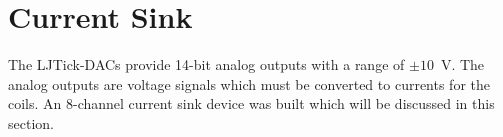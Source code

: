 





\section{Current Sink}\label{sec:sink}


The LJTick-DACs provide 14-bit analog outputs with a range of $\pm10$~V. The analog outputs are voltage signals which must be converted to currents for the coils. An 8-channel current sink device was built which will be discussed in this section. 




